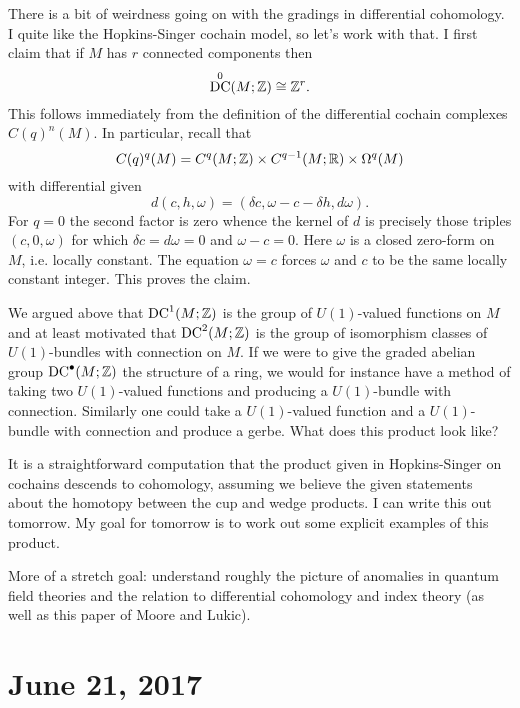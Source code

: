 \documentclass{amsart}
\DeclareMathOperator{\DC}{DC} %
\begin{document}
There is a bit of weirdness going on with the gradings in differential cohomology.
I quite like the Hopkins-Singer cochain model, so let's work with that. I first
claim that if $M$ has $r$ connected components then
\begin{equation*}
    \DC^0(M;\Z) \cong \Z^r.
\end{equation*}
This follows immediately from the definition of the differential cochain complexes
$C(q)^n(M)$. In particular, recall that
\begin{equation*}
    C(q)^q(M) = C^q(M;\mathbb{Z})\times C^{q-1}(M;\mathbb{R})\times \Omega^q(M)
\end{equation*}
with differential given
\begin{equation*}
    d(c,h,\omega) = (\delta c, \omega - c-\delta h, d\omega).
\end{equation*}
For $q=0$ the second factor is zero whence the kernel of $d$ is precisely those triples
$(c,0,\omega)$ for which $\delta c = d\omega = 0$ and $\omega - c=0$. Here $\omega$ is
a closed zero-form on $M$, i.e. locally constant. The equation $\omega = c$ forces
$\omega$ and $c$ to be the same locally constant integer. This proves the claim.

We argued above that $\DC^1(M;\Z)$ is the group of $U(1)$-valued functions on $M$ and
at least motivated that $\DC^2(M;\Z)$ is the group of isomorphism classes of $U(1)$-bundles
with connection on $M$. If we were to give the graded abelian group $\DC^\bullet(M;\Z)$ the
structure of a ring, we would for instance have a method of taking two $U(1)$-valued functions
and producing a $U(1)$-bundle with connection. Similarly one could take a $U(1)$-valued function
and a $U(1)$-bundle with connection and produce a gerbe. What does this product look like?

It is a straightforward computation that the product given in Hopkins-Singer on cochains
descends to cohomology, assuming we believe the given statements about the homotopy between
the cup and wedge products. I can write this out tomorrow. My goal for tomorrow is
to work out some explicit examples of this product.

More of a stretch goal: understand roughly the picture of anomalies in quantum field theories
and the relation to differential cohomology and index theory (as well as this paper of Moore
and Lukic).

\section{June 21, 2017}
\end{document}
